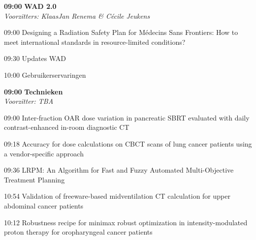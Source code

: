 \documentclass[a4paper,10pt]{report}
\begin{document}
\begin{multicols*}{3}

\begin{packed_enum}
\item[\textbf{09:00}] \textbf{WAD 2.0}\\\textit{Voorzitters: KlaasJan Renema \& Cécile Jeukens}
\item[09:00] Designing a Radiation Safety Plan for Médecins Sans Fron\-tiers: How to meet international standards in resource-limited conditions?
\item[09:30] Updates WAD
\item[10:00] Gebruikerservaringen
\end{packed_enum} %


\begin{packed_enum}
\item[\textbf{09:00}]{\textbf{Technieken}}\\\textit{Voorzitter: TBA}
\item[09:00] Inter-fraction OAR dose variation in pancreatic SBRT eval\-uated with daily contrast-enhanced in-room diagnostic CT
\item[09:18] Accuracy for dose calculations on CBCT scans of lung cancer patients using a vendor-specific approach
\item[09:36] LRPM: An Algorithm for Fast and Fuzzy Automated Multi-Objective Treatment Planning
\item[10:54] Validation of freeware-based midventilation CT calculation for upper abdominal cancer patients
\item[10:12] Robustness recipe for minimax robust optimization in in\-ten\-sity-modulated proton therapy for oropharyngeal can\-cer patients
\end{packed_enum} %



\end{multicols*}
\end{document}

